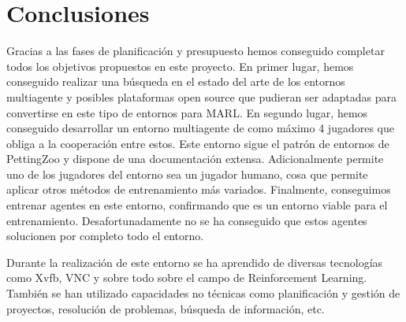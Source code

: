 \chapter{Conclusiones}

Gracias a las fases de planificación y presupuesto hemos conseguido completar todos los objetivos propuestos en este proyecto. En primer lugar, hemos conseguido realizar una búsqueda en el estado del arte de los entornos multiagente y posibles plataformas open source que pudieran ser adaptadas para convertirse en este tipo de entornos para MARL. En segundo lugar, hemos conseguido desarrollar un entorno multiagente de como máximo 4 jugadores que obliga a la cooperación entre estos. Este entorno sigue el patrón de entornos de PettingZoo y dispone de una documentación extensa. Adicionalmente permite uno de los jugadores del entorno sea un jugador humano, cosa que permite aplicar otros métodos de entrenamiento más variados. Finalmente, conseguimos entrenar agentes en este entorno, confirmando que es un entorno viable para el entrenamiento. Desafortunadamente no se ha conseguido que estos agentes solucionen por completo todo el entorno.


Durante la realización de este entorno se ha aprendido de diversas tecnologías como Xvfb, VNC y sobre todo sobre el campo de Reinforcement Learning. También se han utilizado capacidades no técnicas como planificación y gestión de proyectos, resolución de problemas, búsqueda de información, etc.